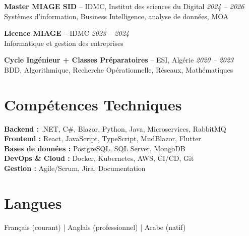 \documentclass[a4paper,10pt]{article}
\begin{document}
\textbf{Master MIAGE SID} -- IDMC, Institut des sciences du Digital \hfill \textit{2024 -- 2026} \\
{\small Systèmes d'information, Business Intelligence, analyse de données, MOA}

\textbf{Licence MIAGE} -- IDMC \hfill \textit{2023 -- 2024} \\
{\small Informatique et gestion des entreprises}

\textbf{Cycle Ingénieur + Classes Préparatoires} -- ESI, Algérie \hfill \textit{2020 -- 2023} \\
{\small BDD, Algorithmique, Recherche Opérationnelle, Réseaux, Mathématiques}

\section{Compétences Techniques}

\textbf{Backend :} .NET, C\#, Blazor, Python, Java, Microservices, RabbitMQ \\
\textbf{Frontend :} React, JavaScript, TypeScript, MudBlazor, Flutter \\
\textbf{Bases de données :} PostgreSQL, SQL Server, MongoDB \\
\textbf{DevOps \& Cloud :} Docker, Kubernetes, AWS, CI/CD, Git \\
\textbf{Gestion :} Agile/Scrum, Jira, Documentation

\section{Langues}
Français (courant) \quad | \quad Anglais (professionnel) \quad | \quad Arabe (natif)
\end{document}
